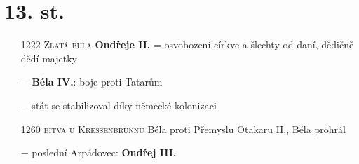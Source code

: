 \documentclass{article}
\begin{document}
\section*{13. st.}
\begin{itemize}
    \vspace{-0.5em}
    \setlength\itemsep{0.15em}
    \item[1222] \textsc{Zlatá bula} \textbf{Ondřeje II.} = osvobození církve a šlechty od daní, dědičně dědí majetky
    \item[$-$] \textbf{Béla IV.}: boje proti Tatarům
    \item[$-$] stát se stabilizoval díky německé kolonizaci
    \item[1260] \textsc{bitva u Kressenbrunnu} Béla proti Přemyslu Otakaru II., Béla prohrál
    \item[$-$] poslední Arpádovec: \textbf{Ondřej III.} 
\end{itemize}
\end{document}
